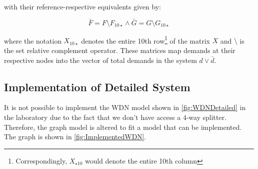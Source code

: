 with their reference-respective equivalents given by:

\begin{equation}\label{eq:FbarGbar}
	\bar{F} = F \setminus F_{10\star} \wedge \bar{G} = G \setminus G_{10\star}
\end{equation}

where the notation $X_{10\star}$ denotes the entire 10th row\footnote{Correspondingly, $X_{\star10}$ would denote the entire 10th column} of the matrix $X$ and $\setminus$ is the set relative complement operator. These matrices map demands at their respective nodes into the vector of total demands in the system $d \vee \bar{d}$.

\newpage
\subsection{Implementation of Detailed System}
It is not possible to implement the WDN model shown in \cref{fig:WDNDetailed} in the laboratory due to the fact that we don't have access a $ 4 $-way splitter. Therefore, the graph model is altered to fit a model that can be implemented. The graph is shown in \cref{fig:ImplementedWDN}.
  
